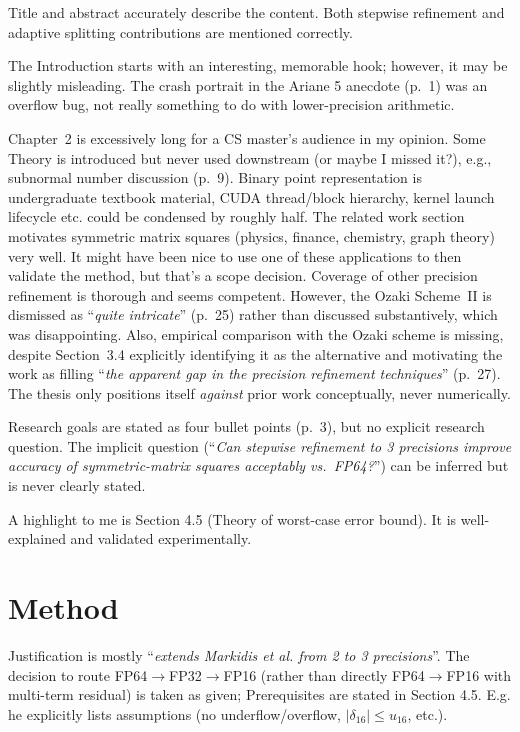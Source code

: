 \documentclass[11pt,a4paper]{article}
\newcommand{\q}[1]{``\textit{#1}''}
\newcommand{\pg}[1]{(p.~#1)}
\begin{document}
Title and abstract accurately describe the content.
Both stepwise refinement and adaptive splitting contributions are mentioned correctly.

The Introduction starts with an interesting, memorable hook; however, it may be slightly misleading.
The crash portrait in the Ariane 5 anecdote \pg{1} was an overflow bug, not really something to do with lower-precision arithmetic.

Chapter~2 is excessively long for a CS master's audience in my opinion.
Some Theory is introduced but never used downstream (or maybe I missed it?), e.g., subnormal number discussion \pg{9}.
Binary point representation is undergraduate textbook material, CUDA thread/block hierarchy, kernel launch lifecycle etc. could be condensed by roughly half.
The related work section motivates symmetric matrix squares (physics, finance, chemistry, graph theory) very well.
It might have been nice to use one of these applications to then validate the method, but that's a scope decision.
Coverage of other precision refinement is thorough and seems competent.
However, the Ozaki Scheme~II is dismissed as \q{quite intricate} \pg{25} rather than discussed substantively, which was disappointing.
Also, empirical comparison with the Ozaki scheme is missing, despite Section~3.4 explicitly identifying it as the alternative and motivating the work as filling \q{the apparent gap in the precision refinement techniques} \pg{27}.
The thesis only positions itself \emph{against} prior work conceptually, never numerically.

Research goals are stated as four bullet points \pg{3}, but no explicit research question.
The implicit question (\q{Can stepwise refinement to 3 precisions improve accuracy of symmetric-matrix squares acceptably vs.~FP64?}) can be inferred but is never clearly stated.

A highlight to me is Section 4.5 (Theory of worst-case error bound).
It is well-explained and validated experimentally.

\section{Method}
Justification is mostly \q{extends Markidis et al. from 2 to 3 precisions}.
The decision to route FP64$\to$FP32$\to$FP16 (rather than directly FP64$\to$FP16 with multi-term residual) is taken as given;
Prerequisites are stated in Section 4.5.
E.g. he explicitly lists assumptions (no underflow/overflow, $|\delta_{16}|\le u_{16}$, etc.).
\end{document}
